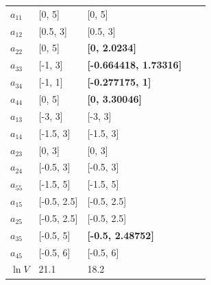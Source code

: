 \begin{tabular}{lllll}
\midrule
$a_{11}$ & [0, 5] & [0, 5]\\
$a_{12}$ & [0.5, 3] & [0.5, 3]\\
$a_{22}$ & [0, 5] & \textbf{[0, 2.0234]}\\
$a_{33}$ & [-1, 3] & \textbf{[-0.664418, 1.73316]}\\
$a_{34}$ & [-1, 1] & \textbf{[-0.277175, 1]}\\
$a_{44}$ & [0, 5] & \textbf{[0, 3.30046]}\\
$a_{13}$ & [-3, 3] & [-3, 3]\\
$a_{14}$ & [-1.5, 3] & [-1.5, 3]\\
$a_{23}$ & [0, 3] & [0, 3]\\
$a_{24}$ & [-0.5, 3] & [-0.5, 3]\\
$a_{55}$ & [-1.5, 5] & [-1.5, 5]\\
$a_{15}$ & [-0.5, 2.5] & [-0.5, 2.5]\\
$a_{25}$ & [-0.5, 2.5] & [-0.5, 2.5]\\
$a_{35}$ & [-0.5, 5] & \textbf{[-0.5, 2.48752]}\\
$a_{45}$ & [-0.5, 6] & [-0.5, 6]\\
$\ln V$ & 21.1 & 18.2\\
\midrule
\bottomrule\end{tabular}
